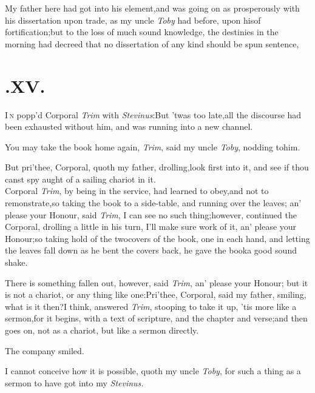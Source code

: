 \documentclass{article}
\begin{document}
My father here had got into his element,\tsh and was going on
as pros\-per\-ously with his dissertation upon trade, as my uncle
\textit{Toby} had before, upon his\break of fortification;\tsh but to the
loss\break
of much sound knowledge, the destinies in the morning had
decreed that no
dissertation of any kind should be spun
\break sentence,

\medskip

\section{.\enspace  XV.}

\lettrine{I}{\,n} popp’d Corporal \textit{Trim} with
\textit{Stevinus}:\tsk But ’twas too late,\tsk all the
discourse had been exhausted without him, and was running into a
new channel.

\tsk You may take the book home again, \textit{Trim}, said my
uncle \textit{Toby}, nodding to\break him.

But pri’thee, Corporal, quoth my father, drolling,\tsk look
first into it, and see if thou canst spy aught of a
sailing\break
chariot in it.\\
\newpage
Corporal \textit{Trim}, by being in the service, had learned to
obey,\tsk and not to remonstrate,\tsk so taking the book to a
side-table, and running over the leaves; an’ please your
Honour, said \textit{Trim}, I can see no such thing;\tsk however,
continued the Corporal, drolling a little in his turn, I’ll
make sure work of it, an’ please your Honour;\tsk so taking
hold of the two\break covers of the book, one in each hand, and letting
the leaves fall down as he bent the covers back, he gave the
book\break a good sound shake.

There is something fallen out, however, said \textit{Trim},
an’ please your Honour; but it is not a chariot, or any
thing like one:\tsk Pri’thee, Corporal, said my father, smiling,
what is it then?\tsk I think, answered \textit{Trim}, stooping to
take it up,\tsk\break  
’tis more like a sermon,\tsk for it begins,
with a text of scripture, and
the chapter and verse;\tsk and then goes on, not as a chariot,
but like a sermon directly.

The company smiled.

I cannot conceive how it is possible, quoth my uncle
\textit{Toby}, for such a thing as a sermon to have got into my
\textit{Stevinus.}
\end{document}
